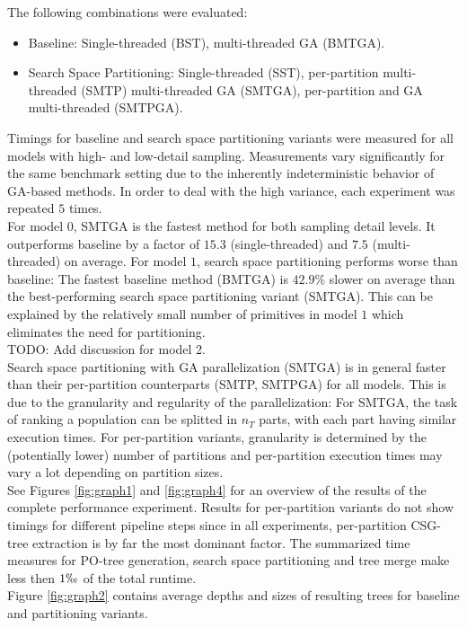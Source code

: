 The following combinations were evaluated:
\begin{itemize}
	\item Baseline: Single-threaded (BST), multi-threaded \ac{GA} (BMTGA).
	\item Search Space Partitioning: Single-threaded (SST), per-partition multi-threaded (SMTP) multi-threaded \ac{GA} (SMTGA), per-partition and \ac{GA} multi-threaded (SMTPGA).
\end{itemize}     
Timings for baseline and search space partitioning variants were measured for all models with high- and low-detail sampling.
Measurements vary significantly for the same benchmark setting due to the inherently indeterministic behavior of \ac{GA}-based methods. 
In order to deal with the high variance, each experiment was repeated $5$ times.
\\
For model $0$, SMTGA is the fastest method for both sampling detail levels. 
It outperforms baseline by a factor of $15.3$ (single-threaded) and $7.5$ (multi-threaded) on average.
For model $1$, search space partitioning performs worse than baseline: 
The fastest baseline method (BMTGA) is $42.9\%$ slower on average than the best-performing search space partitioning variant (SMTGA).
This can be explained by the relatively small number of primitives in model $1$ which eliminates the need for partitioning.
\\
TODO: Add discussion for model 2.
\\
Search space partitioning with \ac{GA} parallelization (SMTGA) is in general faster than their per-partition counterparts (SMTP, SMTPGA) for all models.
This is due to the granularity and regularity of the parallelization: 
For SMTGA, the task of ranking a population can be splitted in $n_T$ parts, with each part having similar execution times.
For per-partition variants, granularity is determined by the (potentially lower) number of partitions and per-partition execution times may vary a lot depending on partition sizes. 
\\
See Figures \ref{fig:graph1} and \ref{fig:graph4} for an overview of the results of the complete performance experiment.
Results for per-partition variants do not show timings for different pipeline steps since in all experiments, per-partition \ac{CSG}-tree extraction is by far the most dominant factor. 
The summarized time measures for \ac{PO}-tree generation, search space partitioning and tree merge make less then $1\permil$ of the total runtime.
\\
Figure \ref{fig:graph2} contains average depths and sizes of resulting trees for baseline and partitioning variants.
